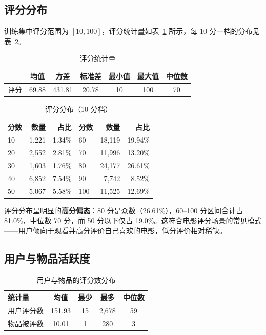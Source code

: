 \documentclass[UTF8,a4paper,10pt]{ctexart}
\begin{document}
\subsection{评分分布}

训练集中评分范围为 $[10, 100]$，评分统计量如表~\ref{tab:rating_stats} 所示，每 10 分一档的分布见表~\ref{tab:rating_dist}。

\begin{table}[htbp]
    \centering
    \caption{评分统计量}
    \label{tab:rating_stats}
    \begin{tabular}{@{}lcccccc@{}}
        \toprule
         & 均值 & 方差 & 标准差 & 最小值 & 最大值 & 中位数 \\
        \midrule
        评分 & 69.88 & 431.81 & 20.78 & 10 & 100 & 70 \\
        \bottomrule
    \end{tabular}
\end{table}

\begin{table}[htbp]
    \centering
    \caption{评分分布（10 分档）}
    \label{tab:rating_dist}
    \begin{tabular}{@{}lrrlrr@{}}
        \toprule
        \textbf{分数} & \textbf{数量} & \textbf{占比} & \textbf{分数} & \textbf{数量} & \textbf{占比} \\
        \midrule
        10 & 1,221 & 1.34\% & 60 & 18,119 & 19.94\% \\
        20 & 2,552 & 2.81\% & 70 & 11,996 & 13.20\% \\
        30 & 1,603 & 1.76\% & 80 & 24,177 & 26.61\% \\
        40 & 6,852 & 7.54\% & 90 & 7,742  & 8.52\%  \\
        50 & 5,067 & 5.58\% & 100 & 11,525 & 12.69\% \\
        \bottomrule
    \end{tabular}
\end{table}

评分分布呈明显的\textbf{高分偏态}：80 分是众数（26.61\%），60--100 分区间合计占 81.0\%，中位数 70 分，而 50 分以下仅占 19.0\%。这符合电影评分场景的常见模式——用户倾向于观看并高分评价自己喜欢的电影，低分评价相对稀缺。

\subsection{用户与物品活跃度}

\begin{table}[htbp]
    \centering
    \caption{用户与物品的评分数分布}
    \label{tab:activity}
    \begin{tabular}{@{}lcccc@{}}
        \toprule
        \textbf{统计量} & \textbf{均值} & \textbf{最少} & \textbf{最多} & \textbf{中位数} \\
        \midrule
        用户评分数   & 151.93 & 15   & 2,678 & 59 \\
        物品被评数   & 10.01  & 1    & 280   & 3  \\
        \bottomrule
    \end{tabular}
\end{table}
\end{document}
